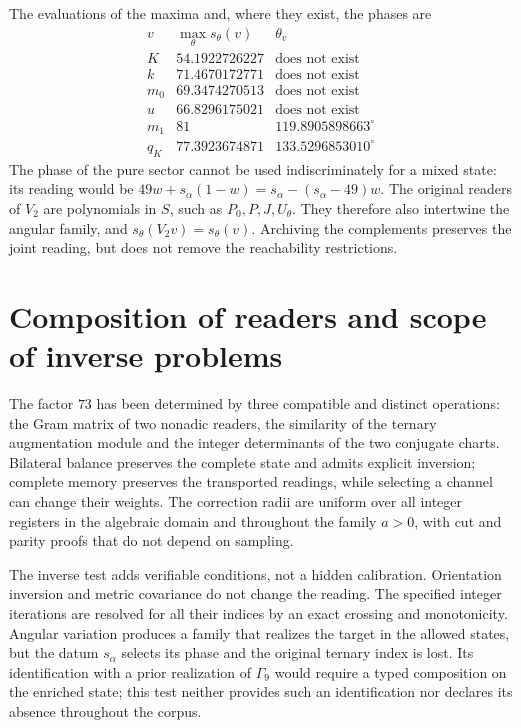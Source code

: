 The evaluations of the maxima and, where they exist, the phases are
\[
\begin{array}{c|c|c}
 v&\max_\theta s_\theta(v)&\theta_v\\\hline
 K&54.1922726227&\text{does not exist}\\
 k&71.4670172771&\text{does not exist}\\
 m_0&69.3474270513&\text{does not exist}\\
 u&66.8296175021&\text{does not exist}\\
 m_1&81&119.8905898663^\circ\\
 q_K&77.3923674871&133.5296853010^\circ
\end{array}
\]
The phase of the pure sector cannot be used indiscriminately for a mixed
state: its reading would be
\(49w+s_\alpha(1-w)=s_\alpha-(s_\alpha-49)w\).
The original readers of \(V_2\) are polynomials in \(S\), such as
\(P_0,P,J,U_\theta\). They therefore also intertwine the angular
family, and \(s_\theta(V_2v)=s_\theta(v)\). Archiving the
complements preserves the joint reading, but does not remove the
reachability restrictions.

\section{Composition of readers and scope of inverse problems}
\label{x_reciprocidad:lib02:alcance}

The factor \(73\) has been determined by three compatible
and distinct operations: the Gram matrix of two nonadic readers, the
similarity of the ternary augmentation module and the integer determinants of
the two conjugate charts. Bilateral balance preserves the complete
state and admits explicit inversion; complete memory preserves the
transported readings, while selecting a channel can change
their weights. The correction radii are uniform over all integer
registers in the algebraic domain and throughout the family \(a>0\), with
cut and parity proofs that do not depend on sampling.

The inverse test adds verifiable conditions, not a hidden
calibration. Orientation inversion and metric covariance do not change
the reading. The specified integer iterations are resolved for
all their indices by an exact crossing and monotonicity. Angular variation
produces a family that realizes the target in the allowed states,
but the datum \(s_\alpha\) selects its phase and the original ternary
index is lost. Its identification with a prior realization of
\(\Gamma_9\) would require a typed composition on the enriched
state; this test neither provides such an identification nor declares its
absence throughout the corpus.

